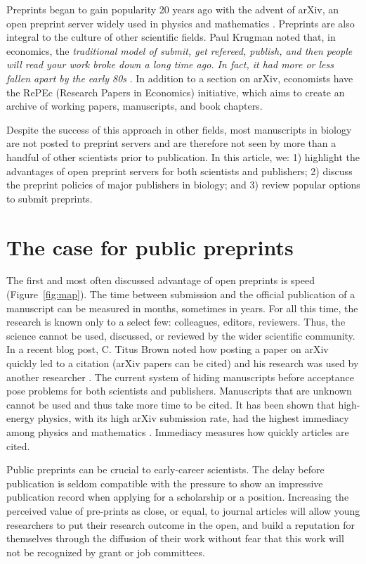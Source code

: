 \documentclass[10pt]{article}
\begin{document}
Preprints began to gain popularity 20 years ago with the advent of arXiv, an
open preprint server widely used in physics and mathematics \cite{gin11}.
Preprints are also integral to the culture of other scientific fields.  Paul
Krugman noted that, in economics, the \emph{traditional model of submit, get
refereed, publish, and then people will read your work broke down a long time
ago. In fact, it had more or less fallen apart by the early 80s} \cite{kru12}.
In addition to a section on arXiv, economists have the RePEc (Research Papers in
Economics) initiative, which aims to create an archive of working papers,
manuscripts, and book chapters.

Despite the success of this approach in other fields, most manuscripts in
biology are not posted to preprint servers and are therefore not seen by more
than a handful of other scientists prior to publication. In this article, we: 1)
highlight the advantages of open preprint servers for both scientists and
publishers; 2) discuss the preprint policies of major publishers in biology; and
3) review popular options to submit preprints.

\section*{The case for public preprints}

The first and most often discussed advantage of open preprints is
speed (Figure~\ref{fig:map}). The time between submission and the official
publication of a manuscript can be measured in months, sometimes in years. For
all this time, the research is known only to a select few: colleagues, editors,
reviewers. Thus, the science cannot be used, discussed, or reviewed by the wider
scientific community. In a recent blog post, C. Titus Brown noted how posting a
paper on arXiv quickly led to a citation (arXiv papers can be cited) and his
research was used by another researcher \cite{bro12}. The current system of
hiding manuscripts before acceptance pose problems for both scientists and
publishers. Manuscripts that are unknown cannot be used and thus take more time
to be cited. It has been shown that high-energy physics, with its high arXiv
submission rate, had the highest immediacy among physics and mathematics
\cite{pra05}. Immediacy measures how quickly articles are cited. 

Public preprints can be crucial to early-career scientists. The delay before
publication is seldom compatible with the pressure to show an impressive
publication record when applying for a scholarship or a position. Increasing the
perceived value of pre-prints as close, or equal, to journal articles will allow
young researchers to put their research outcome in the open, and build a
reputation for themselves through the diffusion of their work without fear that
this work will not be recognized by grant or job committees.
\end{document}
